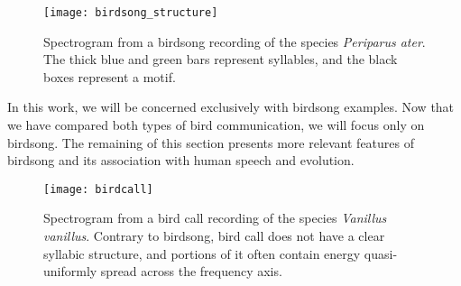 \documentclass[../main.tex]{subfiles} \label{chapter_soa}
\begin{document}
\begin{figure}[t]
\centering
\texttt{[image: birdsong\_structure]}
\caption{Spectrogram from a birdsong recording of the species \emph{Periparus ater}. The thick blue and green bars represent syllables, and the black boxes represent a motif.}
\label{fig_birdsong_structure}
\end{figure}



\par In this work, we will be concerned exclusively with birdsong examples. Now that we have compared both types of bird communication, we will focus only on birdsong. The remaining of this section presents more relevant features of birdsong and its association with human speech and evolution.
\begin{figure}[t]
\centering
\texttt{[image: birdcall]}
\caption{Spectrogram from a bird call recording of the species \emph{Vanillus vanillus}. Contrary to birdsong, bird call does not have a clear syllabic structure, and portions of it often contain energy quasi-uniformly spread across the frequency axis.}
\label{fig_birdcall}
\end{figure}
\end{document}
